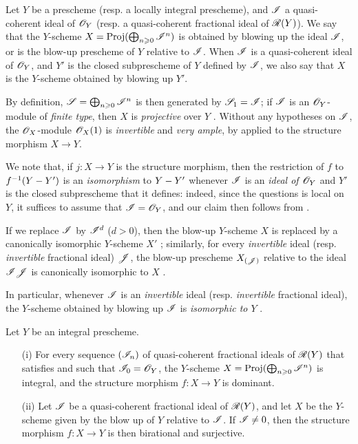 \begin{definition}[8.1.3]
\label{II.8.1.3}
Let $Y$ be a prescheme (resp. a locally integral prescheme), and $\mathscr{I}$ a quasi-coherent ideal of $\mathscr{O}_Y$ (resp. a quasi-coherent fractional ideal of $\mathscr{R}(Y)$).
We say that the $Y$-scheme $X = \operatorname{Proj}(\bigoplus_{n\geqslant0}\mathscr{I}^n)$ is obtained by blowing up the ideal $\mathscr{I}$, or is the blow-up prescheme of $Y$ relative to $\mathscr{I}$.
When $\mathscr{I}$ is a quasi-coherent ideal of $\mathscr{O}_Y$, and $Y'$ is the closed subprescheme of $Y$ defined by $\mathscr{I}$, we also say that $X$ is the $Y$-scheme obtained by blowing up $Y'$.
\end{definition}

By definition, $\mathscr{S} = \bigoplus_{n\geqslant0}\mathscr{I}^n$ is then generated by $\mathscr{S}_1 = \mathscr{I}$;
if $\mathscr{I}$ is an $\mathscr{O}_Y$-module of \emph{finite type}, then $X$ is \emph{projective} over $Y$ .
Without any hypotheses on $\mathscr{I}$, the $\mathscr{O}_X$-module $\mathscr{O}_X(1)$ is \emph{invertible}  and \emph{very ample}, by  applied to the structure morphism $X\to Y$.

We note that, if $j:X\to Y$ is the structure morphism, then the restriction of $f$ to $f^{-1}(Y- Y')$ is an \emph{isomorphism} to $Y- Y'$ whenever $\mathscr{I}$ is an \emph{ideal of $\mathscr{O}_Y$} and $Y'$ is the closed subprescheme that it defines: indeed, since the questions is local on $Y$, it suffices to assume that $\mathscr{I} = \mathscr{O}_Y$, and our claim then follows from .

If we replace $\mathscr{I}$ by $\mathscr{I}^d$ ($d>0$), then the blow-up $Y$-scheme $X$ is replaced by a canonically isomorphic $Y$-scheme $X'$ ;
similarly, for every \emph{invertible} ideal (resp. \emph{invertible} fractional ideal) $\mathscr{J}$, the blow-up prescheme $X_{(\mathscr{J})}$ relative to the ideal $\mathscr{I}\mathscr{J}$ is canonically isomorphic to $X$ .

In particular, whenever $\mathscr{I}$ is an \emph{invertible} ideal (resp. \emph{invertible} fractional ideal), the $Y$-scheme obtained by blowing up $\mathscr{I}$ is \emph{isomorphic to $Y$} .

\begin{proposition}[8.1.3]
\label{II.8.1.4}
Let $Y$ be an integral prescheme.
\begin{enumerate}
    \item[\rm{(i)}] For every sequence $(\mathscr{I}_n)$ of quasi-coherent fractional ideals of $\mathscr{R}(Y)$ that satisfies 
        and such that $\mathscr{I}_0 = \mathscr{O}_Y$, the $Y$-scheme $X=\operatorname{Proj}(\bigoplus_{n\geqslant0}\mathscr{I}^n)$ is integral, and the structure morphism $f:X\to Y$ is dominant.
    \item[\rm{(ii)}] Let $\mathscr{I}$ be a quasi-coherent fractional ideal of $\mathscr{R}(Y)$, and let $X$ be the $Y$-scheme given by the blow up of $Y$ relative to $\mathscr{I}$.
        If $\mathscr{I} \neq 0$, then the structure morphism $f:X\to Y$ is then birational and surjective.
\end{enumerate}
\end{proposition}

